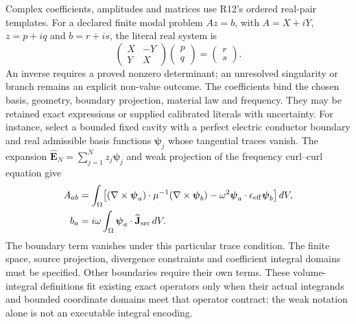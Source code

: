 Complex coefficients, amplitudes and matrices use R12's ordered real-pair
templates. For a declared finite modal problem $Az=b$, with $A=X+iY$,
$z=p+iq$ and $b=r+is$, the literal real system is
\begin{equation}
 \begin{pmatrix}X&-Y\\Y&X\end{pmatrix}
 \begin{pmatrix}p\\q\end{pmatrix}=
 \begin{pmatrix}r\\s\end{pmatrix}.
 \label{eq:r13-em-real-system}
\end{equation}
An inverse requires a proved nonzero determinant; an unresolved singularity
or branch remains an explicit non-value outcome. The coefficients bind the
chosen basis, geometry, boundary projection, material law and frequency.
They may be retained exact expressions or supplied calibrated literals with
uncertainty. For instance, select a bounded fixed cavity with a perfect electric
conductor boundary and real admissible basis functions $\boldsymbol\psi_j$
whose tangential traces vanish. The expansion
$\widehat{\mathbf E}_N=\sum_{j=1}^{N}z_j\boldsymbol\psi_j$ and weak projection
of the frequency curl--curl equation give
\begin{align}
 A_{ab}&=\int_\Omega\!\left[
 (\nabla\times\boldsymbol\psi_a)\cdot\mu^{-1}
 (\nabla\times\boldsymbol\psi_b)
 -\omega^2\boldsymbol\psi_a\cdot\epsilon_{\rm eff}
             \boldsymbol\psi_b\right]dV,\nonumber\\
 b_a&=i\omega\int_\Omega\boldsymbol\psi_a\cdot
                    \widehat{\mathbf J}_{\rm src}\,dV.
 \label{eq:r13-em-modal}
\end{align}
The boundary term vanishes under this particular trace condition. The finite
space, source projection, divergence constraints and coefficient integral
domains must be specified. Other boundaries require their own terms. These
volume-integral definitions fit existing exact operators only when their
actual integrands and bounded coordinate domains meet that operator contract;
the weak notation alone is not an executable integral encoding.


